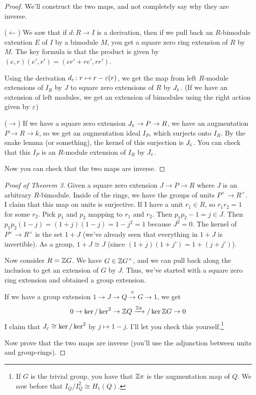 \begin{proof}
 We'll construct the two maps, and not completely say why they are inverse. 
 
 ($\leftarrow$) We saw that if $d\colon R\to I$ is a derivation, then if we pull back an $R$-bimodule extention $E$ of $I$ by a bimodule $M$, you get a square zero ring extension of $R$ by $M$. The key formula is that the product is given by $(e,r)(e',r')=(er'+re',rr')$.
 
 Using the derivation $d_\varepsilon\colon r\mapsto r-\varepsilon(r)$, we get the map from left $R$-module extensions of $I_R$ by $J$ to square zero extensions of $R$ by $J_\varepsilon$. (If we have an extension of left modules, we get an extension of bimodules using the right action given by $\varepsilon$)
 
 ($\to$) If we have a square zero extension $J_\varepsilon\to P\to R$, we have an augmentation $P\to R\to k$, so we get an augmentation ideal $I_P$, which surjects onto $I_R$. By the snake lemma (or something), the kernel of this surjection is $J_\varepsilon$. You can check that this $I_P$ is an $R$-module extension of $I_R$ by $J_\varepsilon$.
 
 Now you can check that the two maps are inverse.
\end{proof}
\begin{proof}[Proof of Theorem 3]
 Given a square zero extension $J\to P\to R$ where $J$ is an arbitrary $R$-bimodule. Inside of the rings, we have the groups of units $P^\times \to R^\times$. I claim that this map on units is surjective. If I have a unit $r_1\in R$, so $r_1r_2=1$ for some $r_2$. Pick $p_1$ and $p_2$ mapping to $r_1$ and $r_2$. Then $p_1p_2-1=j\in J$. Then $p_1p_2 (1-j)=(1+j)(1-j)=1-j^2=1$ because $J^2=0$. The kernel of $P^\times \to R^\times$ is the set $1+J$ (we've already seen that everything in $1+J$ is invertible). As a group, $1+J\cong J$ (since $(1+j)(1+j')=1+(j+j')$).
 
 Now consider $R=\mathbb{Z} G$. We have $G\in \mathbb{Z} G^\times$, and we can pull back along the inclusion to get an extension of $G$ by $J$. Thus, we've started with a square zero ring extension and obtained a group extension.
 
 If we have a group extension $1\to J\to Q\xrightarrow \pi G\to 1$, we get
 \[
  0\to \ker/\ker^2 \to \mathbb{Z} Q\xrightarrow{\mathbb{Z} \pi}/\ker \mathbb{Z} G\to 0
 \]
 I claim that $J_\varepsilon \cong \ker/\ker^2$ by $j\mapsto 1-j$. I'll let you check this yourself.\footnote{If $G$ is the trivial group, you have that $\mathbb{Z} \pi$ is the augmentation map of $Q$. We saw before that $I_Q/I_Q^2\cong H_1(Q)$.}
 
 Now prove that the two maps are inverse (you'll use the adjunction between units and group-rings).
\end{proof}

